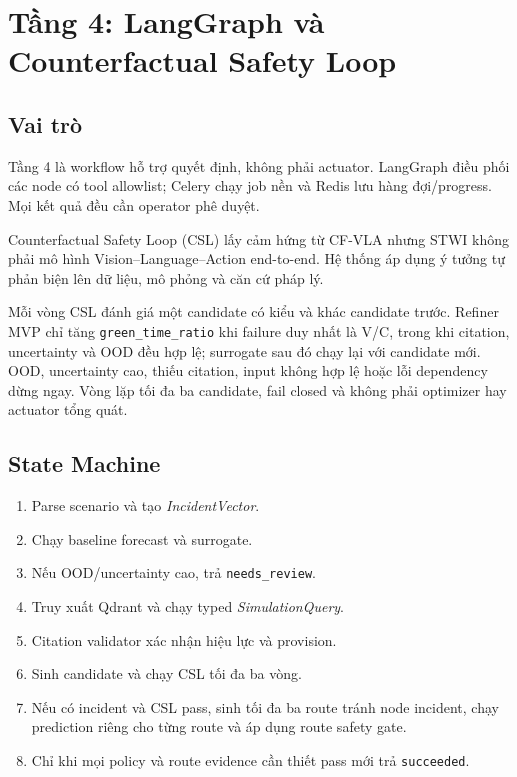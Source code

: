 \chapter{Tầng 4: LangGraph và Counterfactual Safety Loop}

\section{Vai trò}

Tầng 4 là workflow hỗ trợ quyết định, không phải actuator. LangGraph điều phối các node có tool allowlist; Celery chạy job nền và Redis lưu hàng đợi/progress. Mọi kết quả đều cần operator phê duyệt.

Counterfactual Safety Loop (CSL) lấy cảm hứng từ CF-VLA nhưng STWI không phải mô hình Vision--Language--Action end-to-end. Hệ thống áp dụng ý tưởng tự phản biện lên dữ liệu, mô phỏng và căn cứ pháp lý.

Mỗi vòng CSL đánh giá một candidate có kiểu và khác candidate trước. Refiner
MVP chỉ tăng \texttt{green\_time\_ratio} khi failure duy nhất là V/C, trong khi
citation, uncertainty và OOD đều hợp lệ; surrogate sau đó chạy lại với candidate
mới. OOD, uncertainty cao, thiếu citation, input không hợp lệ hoặc lỗi dependency
dừng ngay. Vòng lặp tối đa ba candidate, fail closed và không phải optimizer hay
actuator tổng quát.

\section{State Machine}

\begin{enumerate}[leftmargin=1.5cm]
  \item Parse scenario và tạo \textit{IncidentVector}.
  \item Chạy baseline forecast và surrogate.
  \item Nếu OOD/uncertainty cao, trả \texttt{needs\_review}.
  \item Truy xuất Qdrant và chạy typed \textit{SimulationQuery}.
  \item Citation validator xác nhận hiệu lực và provision.
  \item Sinh candidate và chạy CSL tối đa ba vòng.
  \item Nếu có incident và CSL pass, sinh tối đa ba route tránh node incident,
  chạy prediction riêng cho từng route và áp dụng route safety gate.
  \item Chỉ khi mọi policy và route evidence cần thiết pass mới trả
  \texttt{succeeded}.
\end{enumerate}

